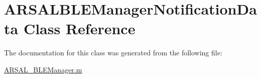 \hypertarget{classARSALBLEManagerNotificationData}{}\section{A\+R\+S\+A\+L\+B\+L\+E\+Manager\+Notification\+Data Class Reference}
\label{classARSALBLEManagerNotificationData}


The documentation for this class was generated from the following file\+:\begin{DoxyCompactItemize}
\item 
\hyperlink{ARSAL__BLEManager_8m}{A\+R\+S\+A\+L\+\_\+\+B\+L\+E\+Manager.\+m}\end{DoxyCompactItemize}
